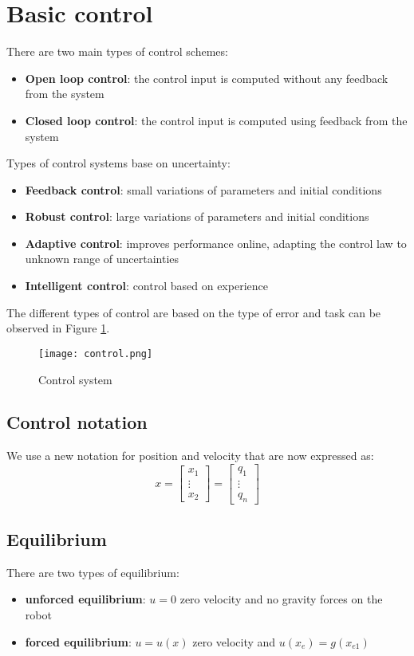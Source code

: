 \documentclass[a4paper,12pt]{article}
\begin{document}
\section{Basic control}
There are two main types of control schemes:
\begin{itemize}
    \item \textbf{Open loop control}: the control input is computed 
    without any feedback from the system
    \item \textbf{Closed loop control}: the control input is computed 
    using feedback from the system
\end{itemize}
Types of control systems base on uncertainty:
\begin{itemize}
    \item \textbf{Feedback control}: small variations of parameters and initial
    conditions
    \item \textbf{Robust control}: large variations of parameters and
     initial conditions
     \item \textbf{Adaptive control}: improves performance online, 
     adapting the control law to unknown
     range of uncertainties
    \item \textbf{Intelligent control}: control based on experience
\end{itemize}
The different types of control are based on the type of
error and task can be observed in Figure \ref{fig:Control system}.
\begin{figure}
    \centering
    \texttt{[image: control.png]}
    \caption{Control system}
    \label{fig:Control system}
\end{figure}
\subsection{Control notation}
We use a new notation for position and velocity that are now expressed as:
\begin{equation}
    x = \begin{bmatrix}
        x_1 \\
        \vdots \\
        x_2
    \end{bmatrix}=
    \begin{bmatrix}
        q_1 \\
        \vdots \\
        q_n
    \end{bmatrix}
\end{equation}
\subsection{Equilibrium}
There are two types of equilibrium:
\begin{itemize}
    \item \textbf{unforced equilibrium}: $u=0$ zero velocity and 
    no gravity forces on the robot
    \item \textbf{forced equilibrium}: $u=u(x)$ zero velocity and
        $u(x_e)=g(x_{e1})$
\end{itemize}
\end{document}
